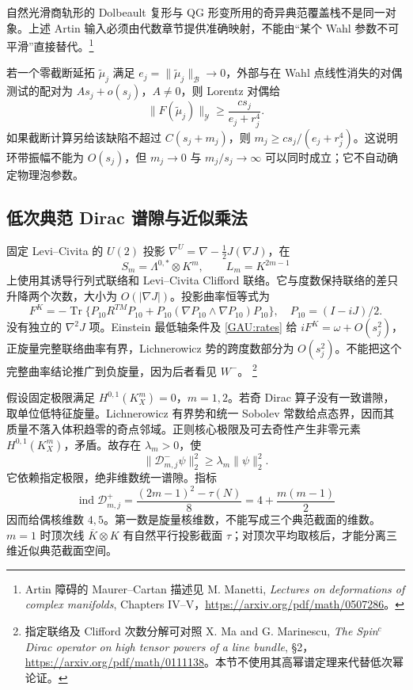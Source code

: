 \documentclass[UTF8,fontset=fandol,zihao=-4,oneside,openany]{ctexbook}
\theoremstyle{cjkplain}
\numberwithin{equation}{chapter}
\begin{document}
自然光滑商轨形的 Dolbeault 复形与 QG 形变所用的奇异典范覆盖栈不是同一对象。上述 Artin 输入必须由代数章节提供准确映射，不能由“某个 Wahl 参数不可平滑”直接替代。\footnote{Artin 障碍的 Maurer--Cartan 描述见 M. Manetti, \emph{Lectures on deformations of complex manifolds}, Chapters IV--V，\url{https://arxiv.org/pdf/math/0507286}。}

若一个零截断延拓 $\widetilde\mu_j$ 满足 $e_j=\|\widetilde\mu_j\|_{\mathcal B}\to0$，外部与在 Wahl 点线性消失的对偶测试的配对为 $As_j+o(s_j)$，$A\ne0$，则 Lorentz 对偶给
\begin{equation}\label{GAU:cutoff-cost}
\|F(\widetilde\mu_j)\|_{\mathcal Y}
\ge\frac{c s_j}{e_j+r_j^4}.
\end{equation}
如果截断计算另给该缺陷不超过 $C(s_j+m_j)$，则
$m_j\ge c s_j/(e_j+r_j^4)$。这说明环带振幅不能为 $O(s_j)$，但 $m_j\to0$ 与 $m_j/s_j\to\infty$ 可以同时成立；它不自动确定物理泡参数。


\subsection{低次典范 Dirac 谱隙与近似乘法}
\label{GAU:Dirac}
固定 Levi--Civita 的 $U(2)$ 投影
$\nabla^U=\nabla-\frac12J(\nabla J)$，在
\[
S_m=\Lambda^{0,*}\otimes K^m,\qquad L_m=K^{2m-1}
\]
上使用其诱导行列式联络和 Levi--Civita Clifford 联络。它与度数保持联络的差只升降两个次数，大小为 $O(|\nabla J|)$。投影曲率恒等式为
\[
F^K=-\operatorname{Tr}\{P_{10}R^{TM}P_{10}
+P_{10}(\nabla P_{10}\wedge\nabla P_{10})P_{10}\},\quad
P_{10}=(I-iJ)/2.
\]
没有独立的 $\nabla^2J$ 项。Einstein 最低轴条件及 \eqref{GAU:rates} 给
$iF^K=\omega+O(s_j^2)$，正旋量完整联络曲率有界，Lichnerowicz 势的跨度数部分为 $O(s_j^2)$。不能把这个完整曲率结论推广到负旋量，因为后者看见 $W^-$。
\footnote{指定联络及 Clifford 次数分解可对照 X. Ma and G. Marinescu, \emph{The Spin$^c$ Dirac operator on high tensor powers of a line bundle}, §2，\url{https://arxiv.org/pdf/math/0111138}。本节不使用其高幂谱定理来代替低次幂论证。}

假设固定极限满足 $H^{0,1}(K_X^m)=0$，$m=1,2$。若奇 Dirac 算子没有一致谱隙，取单位低特征旋量。Lichnerowicz 有界势和统一 Sobolev 常数给点态界，因而其质量不落入体积趋零的奇点邻域。正则核心极限及可去奇性产生非零元素
$H^{0,1}(K_X^m)$，矛盾。故存在 $\lambda_m>0$，使
\begin{equation}\label{GAU:Dirac-gap}
\|\mathcal D^-_{m,j}\psi\|_2^2\ge\lambda_m\|\psi\|_2^2.
\end{equation}
它依赖指定极限，绝非维数统一谱隙。指标
\[
\operatorname{ind}\mathcal D^+_{m,j}
=\frac{(2m-1)^2-\tau(N)}8
=4+\frac{m(m-1)}2
\]
因而给偶核维数 $4,5$。第一数是旋量核维数，不能写成三个典范截面的维数。$m=1$ 时顶次线 $\overline K\otimes K$ 有自然平行投影截面 $\tau$；对顶次平均取核后，才能分离三维近似典范截面空间。
\end{document}
